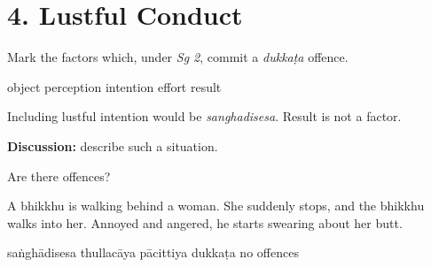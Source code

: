 \chapter{4. Lustful Conduct}
\renewcommand*{\theChapterTitle}{4. Lustful Conduct}

\begin{exam}{\autoExamName}

\begin{problem*}

  \begin{parts}

  \item Mark the factors which, under \textit{Sg 2}, commit a \textit{dukkaṭa} offence.

    \bigskip

    \begin{answers}{6}
      \bChoices
       object\eAns
       perception\eAns
       intention\eAns
       effort\eAns
       result\eAns
      \eChoices
    \end{answers}

    \bigskip

    \begin{solution}
      Including lustful intention would be \emph{sanghadisesa}. Result is not a factor.
    \end{solution}

    \textbf{Discussion:} describe such a situation.

  \end{parts}

\end{problem*}

\problemDivide

\begin{problem*}

  Are there offences?

  \begin{parts}

  \item
    A bhikkhu is walking behind a woman. She suddenly stops, and the bhikkhu walks
    into her. Annoyed and angered, he starts swearing about her butt.

    \bigskip

    \begin{answers}{5}
      \bChoices
       saṅghādisesa\eAns
       thullacāya\eAns
       pācittiya\eAns
       dukkaṭa\eAns
       no offences\eAns
      \eChoices
    \end{answers}


\end{parts}
\end{problem*}
\end{exam}
